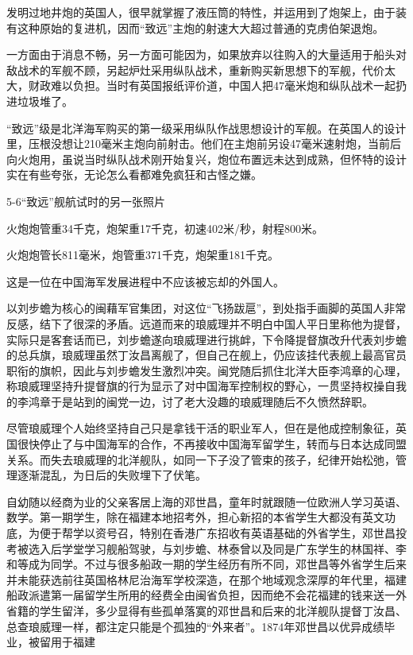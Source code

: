 \documentclass[12pt,UTF8]{ctexbook}
\begin{document}
发明过地井炮的英国人，很早就掌握了液压筒的特性，并运用到了炮架上，由于装有这种原始的复进机，因而“致远”主炮的射速大大超过普通的克虏伯架退炮。

一方面由于消息不畅，另一方面可能因为，如果放弃以往购入的大量适用于船头对敌战术的军舰不顾，另起炉灶采用纵队战术，重新购买新思想下的军舰，代价太大，财政难以负担。当时有英国报纸评价道，中国人把47毫米炮和纵队战术一起扔进垃圾堆了。

“致远”级是北洋海军购买的第一级采用纵队作战思想设计的军舰。在英国人的设计里，压根没想让210毫米主炮向前射击。他们在主炮前另设47毫米速射炮，当前后向火炮用，虽说当时纵队战术刚开始复兴，炮位布置远未达到成熟，但怀特的设计实在有些夸张，无论怎么看都难免疯狂和古怪之嫌。

5-6“致远”舰航试时的另一张照片

火炮炮管重34千克，炮架重17千克，初速402米/秒，射程800米。

火炮炮管长811毫米，炮管重371千克，炮架重181千克。


这是一位在中国海军发展进程中不应该被忘却的外国人。

以刘步蟾为核心的闽藉军官集团，对这位“飞扬跋扈”，到处指手画脚的英国人非常反感，结下了很深的矛盾。远道而来的琅威理并不明白中国人平日里称他为提督，实际只是客套话而已，刘步蟾遂向琅威理进行挑衅，下令降提督旗改升代表刘步蟾的总兵旗，琅威理虽然丁汝昌离舰了，但自己在舰上，仍应该挂代表舰上最高官员职衔的旗帜，因此与刘步蟾发生激烈冲突。闽党随后抓住北洋大臣李鸿章的心理，称琅威理坚持升提督旗的行为显示了对中国海军控制权的野心，一贯坚持权操自我的李鸿章于是站到的闽党一边，讨了老大没趣的琅威理随后不久愤然辞职。

尽管琅威理个人始终坚持自己只是拿钱干活的职业军人，但在是他成控制象征，英国很快停止了与中国海军的合作，不再接收中国海军留学生，转而与日本达成同盟关系。而失去琅威理的北洋舰队，如同一下子没了管束的孩子，纪律开始松弛，管理逐渐混乱，为日后的失败埋下了伏笔。

自幼随以经商为业的父亲客居上海的邓世昌，童年时就跟随一位欧洲人学习英语、数学。第一期学生，除在福建本地招考外，担心新招的本省学生大都没有英文功底，为便于帮学以资号召，特别在香港广东招收有英语基础的外省学生，邓世昌投考被选入后学堂学习舰船驾驶，与刘步蟾、林泰曾以及同是广东学生的林国祥、李和等成为同学。不过与很多船政一期的学生经历有所不同，邓世昌等外省学生后来并未能获选前往英国格林尼治海军学校深造，在那个地域观念深厚的年代里，福建船政派遣第一届留学生所用的经费全由闽省负担，因而绝不会花福建的钱来送一外省籍的学生留洋，多少显得有些孤单落寞的邓世昌和后来的北洋舰队提督丁汝昌、总查琅威理一样，都注定只能是个孤独的“外来者”。1874年邓世昌以优异成绩毕业，被留用于福建
\end{document}

